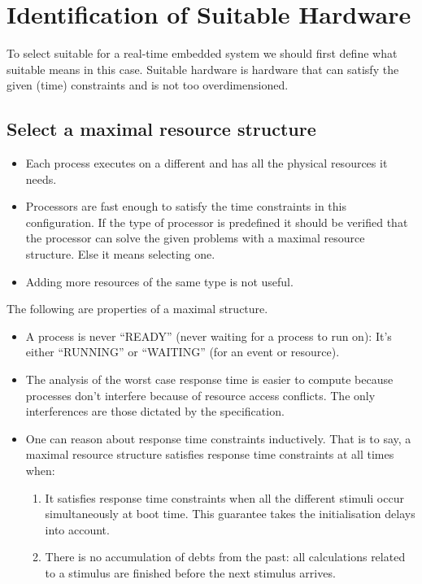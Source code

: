 \documentclass[../main.tex]{subfiles}
\begin{document}
\chapter{Identification of Suitable Hardware}
To select suitable  for a real-time embedded system we should first define what suitable means in this case. Suitable hardware is hardware that can satisfy the given (time) constraints and is not too overdimensioned.

\section{Select a maximal resource structure}

\begin{itemize}
	\item Each process executes on a different  and has all the physical resources it needs.
	\item Processors are fast enough to satisfy the time constraints in this configuration. If the type of processor is predefined it should be verified that the processor can solve the given problems with a maximal resource structure. Else it means selecting one.
	\item Adding more resources of the same type is not useful.
\end{itemize}

The following are properties of a maximal  structure.
\begin{itemize}
	\item A process is never ``READY'' (never waiting for a process to run on): It's either ``RUNNING'' or ``WAITING'' (for an event or resource).
	\item The analysis of the worst case response time is easier to compute because processes don't interfere because of resource access conflicts. The only interferences are those dictated by the specification.
	\item One can reason about response time constraints inductively. That is to say, a maximal resource structure satisfies response time constraints at all times when:
	\begin{enumerate}
		\item It satisfies response time constraints when all the different stimuli occur simultaneously at boot time. This guarantee takes the initialisation delays into account.
		\item There is no accumulation of debts from the past: all calculations related to a stimulus are finished before the next stimulus arrives.
	\end{enumerate}
\end{itemize}
\end{document}
